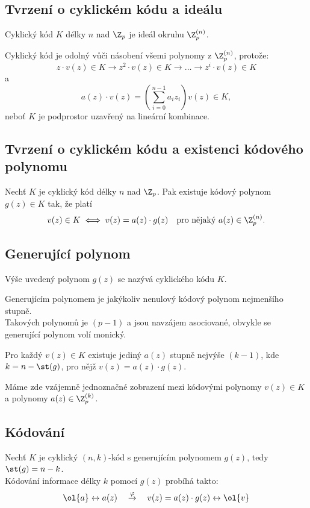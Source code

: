 \subsection{Tvrzení o cyklickém kódu a ideálu}
Cyklický kód $K$ délky $n$ nad $\Z_p$ je ideál okruhu $\Z_p^{(n)}$.

Cyklický kód je odolný vůči násobení všemi polynomy z $\Z_p^{(n)}$, protože:
\begin{equation}
	z \cdot v(z) \in K \rightarrow z^2 \cdot v(z)\in K \rightarrow \dots \rightarrow z^i \cdot v(z) \in K
\end{equation}
a
\begin{equation}
	a(z) \cdot v(z) = \left(\sum_{i=0}^{n-1} a_i z_i \right) v(z) \in K,
\end{equation}
neboť $K$ je podprostor uzavřený na lineární kombinace.

\subsection{Tvrzení o cyklickém kódu a existenci kódového polynomu}
Nechť $K$ je cyklický kód délky $n$ nad $\Z_p$. Pak existuje kódový polynom $g(z) \in K$ tak, že platí
\begin{equation}
	v(z) \in K \iff v(z) = a(z) \cdot g(z) \quad \text{pro nějaký } a(z) \in \Z_p^{(n)}.
\end{equation}

\subsection{Generující polynom}
Výše uvedený polynom $g(z)$ se nazývá  cyklického kódu $K$.

Generujícím polynomem je jakýkoliv nenulový kódový polynom nejmenšího stupně.\\
Takových polynomů je $(p-1)$ a jsou navzájem asociované, obvykle se generující polynom volí monický.

Pro každý $v(z) \in K$ existuje jediný $a(z)$ stupně nejvýše $(k-1)$, kde $k = n-\st(g)$, pro nějž $v(z) = a(z) \cdot g(z)$.

Máme zde vzájemně jednoznačné zobrazení mezi kódovými polynomy $v(z) \in K$ a polynomy $a(z) \in \Z_p^{(k)}$.
\dukaz %

\subsection{Kódování}
Nechť $K$ je cyklický $(n,k)$-kód s generujícím polynomem $g(z)$, tedy $\st(g) = n-k$.\\
Kódování informace délky $k$ pomocí $g(z)$ probíhá takto:
\begin{equation}
	\ol{a} \leftrightarrow a(z) \quad \overset{\varphi}{\rightarrow} \quad v(z) = a(z) \cdot g(z) \leftrightarrow \ol{v} 
\end{equation}

